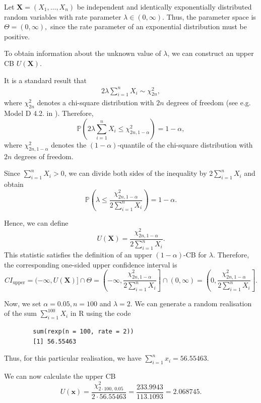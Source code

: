 \begin{example} \label{example:one sided confidence interval}
	Let $\mathbf X = (X_1, \ldots, X_n)$ be independent and identically exponentially distributed random variables with rate parameter $\lambda \in (0,\infty)$. Thus, the parameter space is
	\(
	\Theta = (0,\infty),
	\)
	since the rate parameter of an exponential distribution must be positive.
	
	To obtain information about the unknown value of $\lambda$, we can construct an upper CB $U(\mathbf X)$.
	
	It is a standard result that
	\begin{align} \label{chi squared distributed}
	2\lambda\sum_{i=1}^n X_i \sim \chi^2_{2n},
	\end{align}
	where $\chi^2_{2n}$ denotes a chi-square distribution with $2n$ degrees of freedom (see e.g. Model D 4.2. in \cite{cramer2008grundlagen}). Therefore,
	\[
	\mathbb{P}\left(
	2\lambda\sum_{i=1}^n X_i
	\leq
	\chi^2_{2n,1-\alpha}
	\right)
	= 1-\alpha,
	\]
	where $\chi^2_{2n,1-\alpha}$ denotes the $(1-\alpha)$-quantile of the chi-square distribution with $2n$ degrees of freedom.
	
	Since $\sum_{i=1}^n X_i > 0$, we can divide both sides of the inequality by $2\sum_{i=1}^n X_i$ and obtain
	\[
	\mathbb{P}\left(
	\lambda
	\leq
	\frac{\chi^2_{2n,1-\alpha}}
	{2\sum_{i=1}^n X_i}
	\right)
	= 1-\alpha.
	\]
	
	Hence, we can define
	\[
	U(\mathbf X)
	=
	\frac{\chi^2_{2n,1-\alpha}}
	{2\sum_{i=1}^n X_i}.
	\]
	This statistic satisfies the definition of an upper $(1-\alpha)$-CB for $\lambda$. Therefore, the corresponding one-sided upper confidence interval is
	\[
		CI_{\text{upper}}
		=
		(-\infty,U(\mathbf X)]\cap\Theta
		=
		\left(
		-\infty,
		\frac{\chi^2_{2n,1-\alpha}}
		{2\sum_{i=1}^n X_i}
		\right]
		\cap (0,\infty)
		=
		\left(
		0,
		\frac{\chi^2_{2n,1-\alpha}}
		{2\sum_{i=1}^n X_i}
		\right].
	\]
	
	
	Now, we set $\alpha = 0.05, n = 100$ and $\lambda = 2$. We can generate a random realisation of the sum
	\(
	\sum_{i=1}^{100} X_i
	\)
	in R using the code
	
	\begin{verbatim}
		sum(rexp(n = 100, rate = 2))
		[1] 56.55463
	\end{verbatim}
	
	Thus, for this particular realisation, we have
	\(
	\sum_{i=1}^n x_i = 56.55463.
	\)
	
	We can now calculate the upper CB
	\[
	U(\mathbf x)
	=
	\frac{\chi^2_{2\cdot100,\,0.05}}
	{2\cdot56.55463}
	=
	\frac{233.9943}{113.1093}
	=
	2.068745.
	\]
	

\end{example}
